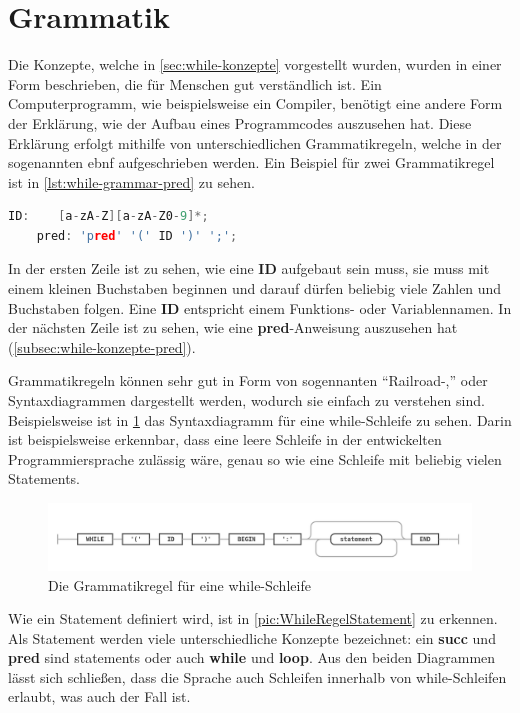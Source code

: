 \section{Grammatik}
Die Konzepte, welche in \cref{sec:while-konzepte} vorgestellt wurden, wurden in einer Form beschrieben, die für Menschen gut verständlich ist. Ein Computerprogramm, wie beispielsweise ein Compiler, benötigt eine andere Form der Erklärung, wie der Aufbau eines Programmcodes auszusehen hat. Diese Erklärung erfolgt mithilfe von unterschiedlichen  Grammatikregeln, welche in der sogenannten \ac{ebnf} aufgeschrieben werden. Ein Beispiel für zwei Grammatikregel ist in \cref{lst:while-grammar-pred} zu sehen.

\begin{lstlisting}[language=c, caption=Zwei einfache Grammatikregel, label={lst:while-grammar-pred}]
	ID:    [a-zA-Z][a-zA-Z0-9]*;
	pred: 'pred' '(' ID ')' ';';
\end{lstlisting}

In der ersten Zeile ist zu sehen, wie eine \textbf{ID} aufgebaut sein muss, sie muss mit einem kleinen Buchstaben beginnen und darauf dürfen beliebig viele Zahlen und Buchstaben folgen. Eine \textbf{ID} entspricht einem Funktions- oder Variablennamen.  In der nächsten Zeile ist zu sehen, wie eine \textbf{pred}-Anweisung auszusehen hat (\cref{subsec:while-konzepte-pred}).

Grammatikregeln können sehr gut in Form von sogennanten \enquote{Railroad-,} oder {Syntaxdiagrammen} dargestellt werden, wodurch sie einfach zu verstehen sind. Beispielsweise ist in \cref{pic:WhileRegelWhile} das Syntaxdiagramm für eine while-Schleife zu sehen. Darin ist beispielsweise erkennbar, dass eine leere Schleife in der entwickelten Programmiersprache zulässig wäre, genau so wie eine Schleife mit beliebig vielen Statements.

\begin{figure}[h!]
	\centering
	\includegraphics[width=14cm]{content/pictures/while.png}
	\caption{Die Grammatikregel für eine while-Schleife}
	\label{pic:WhileRegelWhile}
\end{figure}

Wie ein Statement definiert wird, ist in \cref{pic:WhileRegelStatement} zu erkennen. Als Statement werden viele unterschiedliche Konzepte bezeichnet: ein \textbf{succ} und \textbf{pred} sind statements oder auch \textbf{while} und \textbf{loop}. Aus den beiden Diagrammen lässt sich schließen, dass die Sprache auch Schleifen innerhalb von while-Schleifen erlaubt, was auch der Fall ist. 

